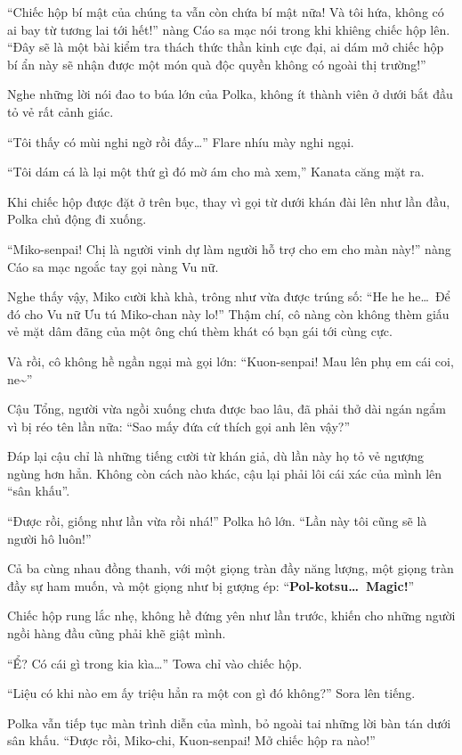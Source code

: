 \documentclass[../main.tex]{subfiles}
\begin{document}
``Chiếc hộp bí mật của chúng ta vẫn còn chứa bí mật nữa! Và tôi hứa, không có ai bay từ tương lai tới hết!'' nàng Cáo sa mạc nói trong khi khiêng chiếc hộp lên. ``Đây sẽ là một bài kiểm tra thách thức thần kinh cực đại, ai dám mở chiếc hộp bí ẩn này sẽ nhận được một món quà độc quyền không có ngoài thị trường!''

Nghe những lời nói đao to búa lớn của Polka, không ít thành viên ở dưới bắt đầu tỏ vẻ rất cảnh giác.

``Tôi thấy có mùi nghi ngờ rồi đấy\dots'' Flare nhíu mày nghi ngại.

``Tôi dám cá là lại một thứ gì đó mờ ám cho mà xem,'' Kanata căng mặt ra.

Khi chiếc hộp được đặt ở trên bục, thay vì gọi từ dưới khán đài lên như lần đầu, Polka chủ động đi xuống.

``Miko-senpai! Chị là người vinh dự làm người hỗ trợ cho em cho màn này!'' nàng Cáo sa mạc ngoắc tay gọi nàng Vu nữ.

Nghe thấy vậy, Miko cười khà khà, trông như vừa được trúng số: ``He he he\dots\ Để đó cho Vu nữ Ưu tú Miko-chan này lo!'' Thậm chí, cô nàng còn không thèm giấu vẻ mặt dâm đãng của một ông chú thèm khát có bạn gái tới cùng cực.

Và rồi, cô không hề ngần ngại mà gọi lớn: ``Kuon-senpai! Mau lên phụ em cái coi, ne\~{}''

Cậu Tổng, người vừa ngồi xuống chưa được bao lâu, đã phải thở dài ngán ngẩm vì bị réo tên lần nữa: ``Sao mấy đứa cứ thích gọi anh lên vậy?''

Đáp lại cậu chỉ là những tiếng cười từ khán giả, dù lần này họ tỏ vẻ ngượng ngùng hơn hẳn. Không còn cách nào khác, cậu lại phải lôi cái xác của mình lên ``sân khấu''.

``Được rồi, giống như lần vừa rồi nhá!'' Polka hô lớn. ``Lần này tôi cũng sẽ là người hô luôn!''

Cả ba cùng nhau đồng thanh, với một giọng tràn đầy năng lượng, một giọng tràn đầy sự ham muốn, và một giọng như bị gượng ép: ``\textbf{Pol-kotsu\dots\ Magic!}''

Chiếc hộp rung lắc nhẹ, không hề đứng yên như lần trước, khiến cho những người ngồi hàng đầu cũng phải khẽ giật mình.

``Ể? Có cái gì trong kia kìa\dots'' Towa chỉ vào chiếc hộp.

``Liệu có khi nào em ấy triệu hẳn ra một con gì đó không?'' Sora lên tiếng.

Polka vẫn tiếp tục màn trình diễn của mình, bỏ ngoài tai những lời bàn tán dưới sân khấu. ``Được rồi, Miko-chi, Kuon-senpai! Mở chiếc hộp ra nào!''
\end{document}
